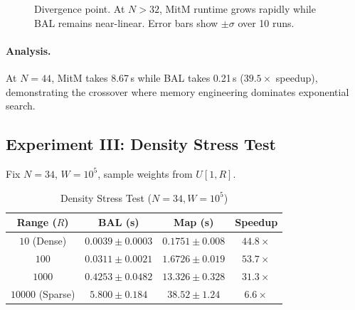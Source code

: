 \documentclass[a4paper,USenglish]{lipics-v2021}
\begin{document}
\begin{figure}[t]
\centering
{}
\caption{Divergence point. At $N>32$, MitM runtime grows rapidly while BAL remains near-linear. Error bars show $\pm\sigma$ over 10 runs.}
\label{fig:scalability}
\end{figure}

\paragraph*{Analysis.}
At $N=44$, MitM takes 8.67\,s while BAL takes 0.21\,s ($39.5\times$ speedup), demonstrating the crossover where memory engineering dominates exponential search.

\subsection{Experiment III: Density Stress Test}
Fix $N=34$, $W=10^5$, sample weights from $U[1,R]$.

\begin{table}[t]
\centering
\caption{Density Stress Test ($N=34, W=10^5$)}
\label{tab:density}
\begin{tabular}{@{}cccc@{}}
\toprule
Range ($R$) & BAL (s) & Map (s) & Speedup \\
\midrule
$10$ (Dense) & $0.0039 \pm 0.0003$ & $0.1751 \pm 0.008$ & $44.8\times$ \\
$100$        & $0.0311 \pm 0.0021$ & $1.6726 \pm 0.019$ & $53.7\times$ \\
$1000$       & $0.4253 \pm 0.0482$ & $13.326 \pm 0.328$ & $31.3\times$ \\
$10000$ (Sparse) & $5.800 \pm 0.184$ & $38.52 \pm 1.24$ & $6.6\times$ \\
\bottomrule
\end{tabular}
\end{table}
\end{document}
